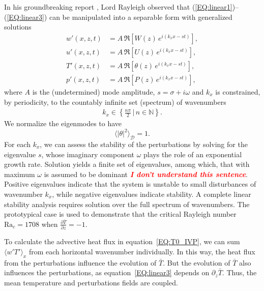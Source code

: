\documentclass[reprint,amsmath,amssymb,aps]{revtex4-1}
\newcommand{\note}[1]{\noindent \textbf{\textit{\textcolor{Red}{#1}}}}
\newcommand\Ra{\mathrm{Ra}}
\newcommand{\eqss}[2]{(\ref{#1})--(\ref{#2})}
\begin{document}
In his groundbreaking report \cite{Rayleigh_1916}, Lord Rayleigh observed that \eqss{EQ:linear1}{EQ:linear3} can be manipulated into a separable form with generalized solutions
\begin{align}
    w'(x, z, t) &= A\, \Re\left[W(z) \, e^{i(k_xx-st)}\right], \label{EQ:normal_modes1}\\ 
    u'(x, z, t) &= A\, \Re\left[U(z) \, e^{i(k_xx-st)}\right], \label{EQ:normal_modes2}\\ 
    T'(x, z, t) &= A\, \Re\left[\theta(z) \, e^{i(k_xx-st)}\right], \label{EQ:normal_modes3}\\ 
    p'(x, z, t) &= A\, \Re\left[P(z) \, e^{i(k_xx-st)}\right], \label{EQ:normal_modes4}
\end{align}
where $A$ is the (undetermined) mode amplitude, $s = \sigma + i\omega$ and $k_x$ is constrained, by periodicity, to the countably infinite set (spectrum) of wavenumbers
\begin{align}
    k_x \in \left\{\frac{n\pi}{2} \, \big| \, n \in \mathbb{N}\right\}.
\end{align}
We normalize the eigenmodes to have
\begin{equation}
  \langle |\theta|^2 \rangle_{\mathcal{D}} = 1.
\end{equation}
For each $k_x$, we can assess the stability of the perturbations by solving for the eigenvalue $s$, whose imaginary component $\omega$ plays the role of an exponential growth rate. 
Solution yields a finite set of eigenvalues, among which, that with maximum $\omega$ is assumed to be dominant \note{I don't understand this sentence}. 
Positive eigenvalues indicate that the system is unstable to small disturbances of wavenumber $k_x$, while negative eigenvalues indicate stability. 
A complete linear stability analysis requires solution over the full spectrum of wavenumbers. 
The prototypical case is used to demonstrate that the critical Rayleigh number $\Ra_c = 1708$ when $\frac{\partial \bar{T}}{\partial z} = -1$.

To calculate the advective heat flux in equation~\ref{EQ:T0_IVP}, we can sum $\langle w'T' \rangle_x$ from each horizontal wavenumber individually.
In this way, the heat flux from the perturbations influence the evolution of $\bar{T}$.
But the evolution of $\bar{T}$ also influences the perturbations, as equation~\ref{EQ:linear3} depends on $\partial_z \bar{T}$.
Thus, the mean temperature and perturbations fields are coupled.
\end{document}
